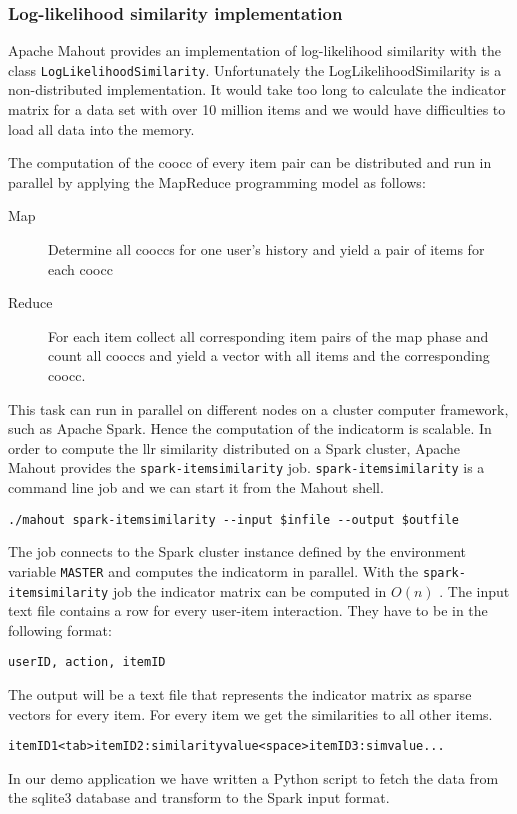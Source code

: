 \subsubsection{Log-likelihood similarity implementation}
\label{sec:llrimpl}

Apache Mahout provides an implementation of log-likelihood similarity with the class \verb|LogLikelihoodSimilarity|. Unfortunately the LogLikelihoodSimilarity is a non-distributed implementation. It would take too long to calculate the indicator matrix for a data set with over 10 million items and we would have difficulties to load all data into the memory. 

The computation of the \gls{coocc} of every item pair can be distributed and run in parallel by applying the MapReduce programming model as follows:
\begin{description}
\item[Map] Determine all \glspl{coocc} for one user's history and yield a pair of items for each \gls{coocc}
\item[Reduce] For each item collect all corresponding item pairs of the map phase and count all \glspl{coocc} and yield a vector with all items and the corresponding \gls{coocc}.
\end{description}

This task can run in parallel on different nodes on a cluster computer framework, such as Apache Spark. Hence the computation of the \gls{indicatorm} is \gls{scalable}.
In order to compute the \gls{llr} similarity distributed on a Spark cluster, Apache Mahout provides the \verb|spark-itemsimilarity| job. 
\verb|spark-itemsimilarity| is a command line job and we can start it from the Mahout shell.
\begin{verbatim}
./mahout spark-itemsimilarity --input $infile --output $outfile
\end{verbatim}
The job connects to the Spark cluster instance defined by the environment variable \verb|MASTER| and computes the \gls{indicatorm} in parallel. With the \verb|spark-itemsimilarity| job the indicator matrix can be computed in $O(n)$ \cite{Schelter}. 
The input text file contains a row for every user-item interaction. They have to be in the following format:
\begin{verbatim}
userID, action, itemID
\end{verbatim}
The output will be a text file that represents the indicator matrix as sparse vectors for every item. For every item we get the similarities to all other items.
\begin{verbatim}
itemID1<tab>itemID2:similarityvalue<space>itemID3:simvalue...
\end{verbatim}

In our demo application we have written a Python script to fetch the data from the sqlite3 database and transform to the Spark input format.

